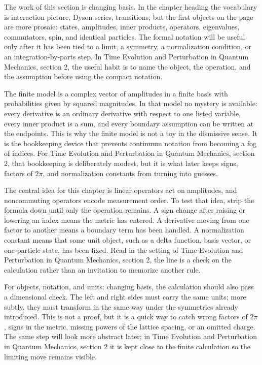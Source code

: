 The work of this section is changing basis.  In the chapter heading the vocabulary is interaction picture, Dyson series, transitions, but the first objects on the page are more prosaic: states, amplitudes, inner products, operators, eigenvalues, commutators, spin, and identical particles.  The formal notation will be useful only after it has been tied to a limit, a symmetry, a normalization condition, or an integration-by-parts step.  In Time Evolution and Perturbation in Quantum Mechanics, section 2, the useful habit is to name the object, the operation, and the assumption before using the compact notation.

The finite model is a complex vector of amplitudes in a finite basis with probabilities given by squared magnitudes.  In that model no mystery is available: every derivative is an ordinary derivative with respect to one listed variable, every inner product is a sum, and every boundary assumption can be written at the endpoints.  This is why the finite model is not a toy in the dismissive sense.  It is the bookkeeping device that prevents continuum notation from becoming a fog of indices.  For Time Evolution and Perturbation in Quantum Mechanics, section 2, that bookkeeping is deliberately modest, but it is what later keeps signs, factors of \(2\pi\), and normalization constants from turning into guesses.

The central idea for this chapter is linear operators act on amplitudes, and noncommuting operators encode measurement order.  To test that idea, strip the formula down until only the operation remains.  A sign change after raising or lowering an index means the metric has entered.  A derivative moving from one factor to another means a boundary term has been handled.  A normalization constant means that some unit object, such as a delta function, basis vector, or one-particle state, has been fixed.  Read in the setting of Time Evolution and Perturbation in Quantum Mechanics, section 2, the line is a check on the calculation rather than an invitation to memorize another rule.

For objects, notation, and units: changing basis, the calculation should also pass a dimensional check.  The left and right sides must carry the same units; more subtly, they must transform in the same way under the symmetries already introduced.  This is not a proof, but it is a quick way to catch wrong factors of \(2\pi\), signs in the metric, missing powers of the lattice spacing, or an omitted charge.  The same step will look more abstract later; in Time Evolution and Perturbation in Quantum Mechanics, section 2 it is kept close to the finite calculation so the limiting move remains visible.

